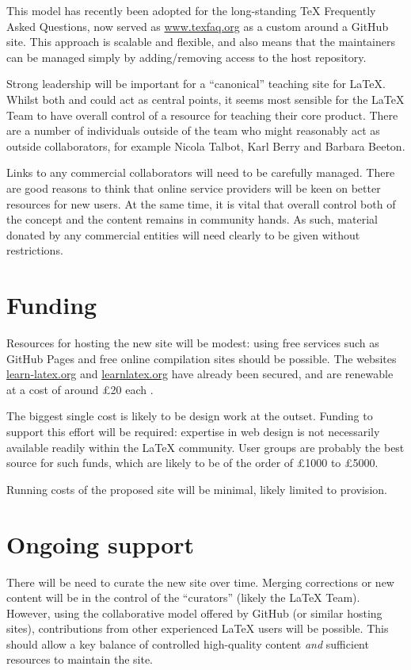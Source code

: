 \documentclass{article}
\begin{document}
This model has recently been adopted for the long-standing \TeX{} Frequently
Asked Questions, now served as \url{www.texfaq.org} as a custom 
around a GitHub site. This approach is scalable and flexible, and also means
that the maintainers can be managed simply by adding/removing access to the
host repository.

Strong leadership will be important for a \enquote{canonical} teaching site for
\LaTeX{}. Whilst both  and  could act as central
points, it seems most sensible for the \LaTeX{} Team to have overall control of
a resource for teaching their core product. There are a number of individuals
outside of the team who might reasonably act as outside collaborators, for
example Nicola Talbot, Karl Berry and Barbara Beeton.

Links to any commercial collaborators will need to be carefully managed. There
are good reasons to think that online service providers will be keen on better
resources for new users. At the same time, it is vital that overall control
both of the concept and the content remains in community hands. As such,
material donated by any commercial entities will need clearly to be given
without restrictions.

\section{Funding}

Resources for hosting the new site will be modest: using free services such
as GitHub Pages and free online compilation sites should be possible. The
websites \url{learn-latex.org} and \url{learnlatex.org} have already been
secured, and are renewable at a cost of around \pounds 20 each .

The biggest single cost is likely to be design work at the outset. Funding
to support this effort will be required: expertise in web design is not
necessarily available readily within the \LaTeX{} community. User groups
are probably the best source for such funds, which are likely to be of
the order of \pounds 1000 to \pounds 5000.

Running costs of the proposed site will be minimal, likely limited
to  provision.

\section{Ongoing support}

There will be need to curate the new site over time. Merging corrections or new
content will be in the control of the \enquote{curators} (likely the \LaTeX{}
Team). However, using the collaborative model offered by GitHub (or similar
hosting sites), contributions from other experienced \LaTeX{} users will be
possible. This should allow a key balance of controlled high-quality content
\emph{and} sufficient resources to maintain the site.
\end{document}
